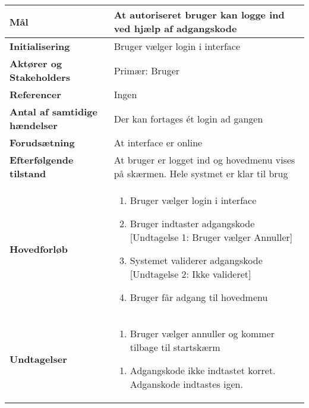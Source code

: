 \begin{table}[H] \centering
\begin{tabular}{|p{6cm}|p{8cm}|}
	\hline
\textbf{Mål}								
&At autoriseret bruger kan logge ind ved hjælp af adgangskode
 \\\hline
\textbf{Initialisering}					
&Bruger vælger login i interface
 \\\hline
\textbf{Aktører og Stakeholders}			
&Primær: Bruger
 \\\hline
\textbf{Referencer}						
&Ingen
 \\\hline
\textbf{Antal af samtidige hændelser}	
&Der kan fortages ét login ad gangen
 \\\hline
\textbf{Forudsætning}					
&At interface er online
 \\\hline
\textbf{Efterfølgende tilstand}			
&At bruger er logget ind og hovedmenu vises på skærmen. Hele systmet er klar til brug
 \\\hline
\textbf{Hovedforløb}						
& 
\begin{enumerate}

\item Bruger vælger login i interface

\item \label{UC8und1}Bruger indtaster adgangskode [Undtagelse 1: Bruger vælger Annuller]

\item \label{UC8und2} Systemet validerer adgangskode [Undtagelse 2: Ikke valideret]

\item Bruger får adgang til hovedmenu
 
\end{enumerate}
\\\hline

\textbf{Undtagelser}						
&\begin{enumerate}[label= \ref{UC8und1}a.]
			\item Bruger vælger annuller og kommer tilbage til startskærm
		\end{enumerate}
											
		\begin{enumerate}[label= \ref{UC8und2}a.]
			\item Adgangskode ikke indtastet korret. Adganskode indtastes igen.
		\end{enumerate} \\\hline


	\end{tabular}
	\label{UC1} 
\end{table}